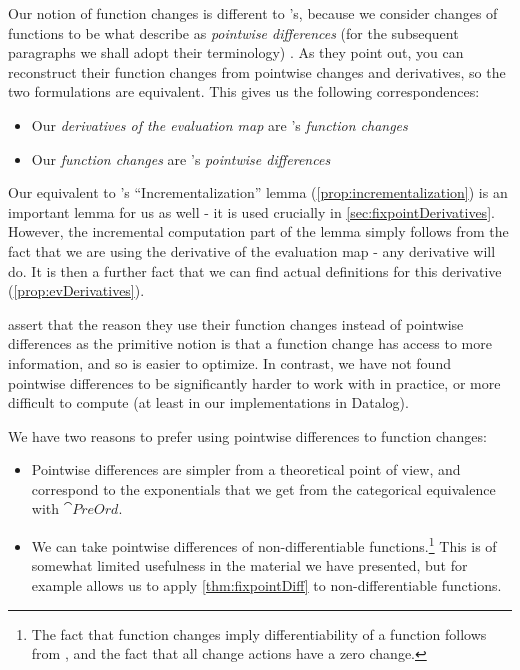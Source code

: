 Our notion of function changes is different to \citeauthor{cai2014changes}'s,
because we consider changes of functions to be what \citeauthor{cai2014changes} describe as
\textit{pointwise differences} (for the subsequent paragraphs we shall adopt
their terminology) \autocite[See][section 2.2]{cai2014changes}. As they point out, you can reconstruct their
function changes from pointwise changes and derivatives, so the two formulations
are equivalent. This gives us the following correspondences:
\begin{itemize}
  \item Our \textit{derivatives of the
      evaluation map} are \citeauthor{cai2014changes}'s \textit{function changes}
  \item Our \textit{function changes} are \citeauthor{cai2014changes}'s \textit{pointwise differences}
\end{itemize}

Our equivalent to \citeauthor{cai2014changes}'s ``Incrementalization'' lemma
(\cref{prop:incrementalization}) is an important lemma for us as well - it is used
crucially in \cref{sec:fixpointDerivatives}. However, the incremental computation part of
the lemma simply follows from the fact that we are using the derivative of the
evaluation map - any derivative will do. It is then a further fact that we can
find actual definitions for this derivative (\cref{prop:evDerivatives}).

\citeauthor{cai2014changes} assert that the reason they use their function changes instead of pointwise
differences as the primitive notion is that a function change has access to more
information, and so is easier to optimize. In contrast, we have not found pointwise differences to be
significantly harder to work with in practice, or more difficult to compute (at least in our implementations
in Datalog).

We have two reasons to prefer using pointwise differences to function changes:
\begin{itemize}
  \item Pointwise differences are simpler from a theoretical point of view, and
    correspond to the exponentials that we get from the categorical equivalence with $\cat{PreOrd}$.
  \item We can take pointwise differences of non-differentiable
    functions.\footnote{The fact that function changes imply differentiability
      of a function follows from \textcite[][Theorem 2.10]{cai2014changes}, and
      the fact that all change actions have a zero change.} This
    is of somewhat limited usefulness in the material we have presented, but for
    example allows us to apply \cref{thm:fixpointDiff} to non-differentiable functions.
\end{itemize}

